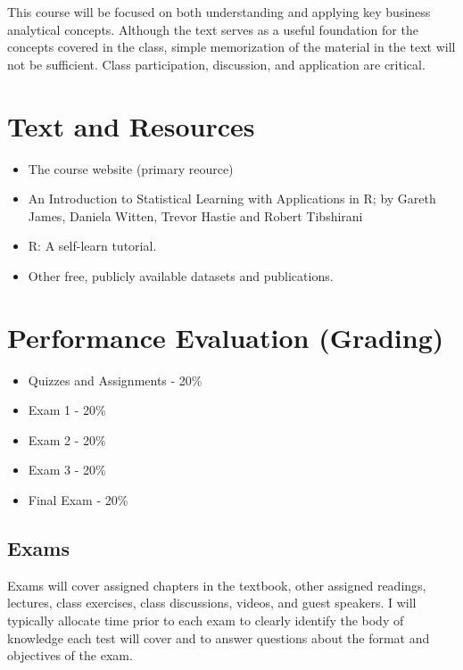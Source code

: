 \documentclass[
]{book}
\providecommand{\tightlist}{%
  \setlength{\itemsep}{0pt}\setlength{\parskip}{0pt}}
\begin{document}
This course will be focused on both understanding and applying key business analytical concepts. Although the text serves as a useful foundation for the concepts covered in the class, simple memorization of the material in the text will not be sufficient. Class participation, discussion, and application are critical.

\hypertarget{text-and-resources}{%
\section{Text and Resources}\label{text-and-resources}}

\begin{itemize}
\tightlist
\item
  The course website (primary reource)
\item
  An Introduction to Statistical Learning with Applications in R; by Gareth James, Daniela Witten, Trevor Hastie and Robert Tibshirani
\item
  R: A self-learn tutorial.
\item
  Other free, publicly available datasets and publications.
\end{itemize}

\hypertarget{performance-evaluation-grading}{%
\section{Performance Evaluation (Grading)}\label{performance-evaluation-grading}}

\begin{itemize}
\tightlist
\item
  Quizzes and Assignments - 20\%
\item
  Exam 1 - 20\%
\item
  Exam 2 - 20\%
\item
  Exam 3 - 20\%
\item
  Final Exam - 20\%
\end{itemize}

\hypertarget{exams}{%
\subsection{Exams}\label{exams}}

Exams will cover assigned chapters in the textbook, other assigned readings, lectures, class exercises, class discussions, videos, and guest speakers. I will typically allocate time prior to each exam to clearly identify the body of knowledge each test will cover and to answer questions about the format and objectives of the exam.
\end{document}
